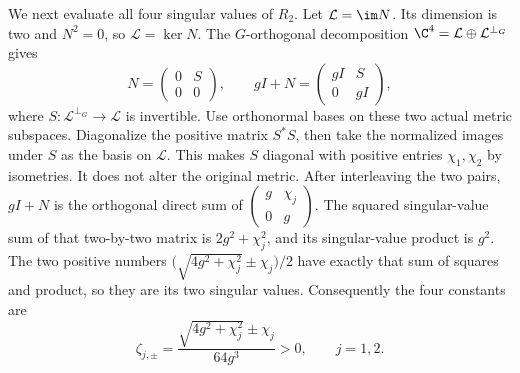 We next evaluate all four singular values of $R_2$.
Let $\mathcal L=\im N$. Its dimension is two and $N^2=0$,
so $\mathcal L=\ker N$. The $G$-orthogonal decomposition
$\C^4=\mathcal L\oplus\mathcal L^{\perp_G}$ gives
\begin{equation}
 N=\begin{pmatrix}0&S\\0&0\end{pmatrix},\qquad
 gI+N=\begin{pmatrix}gI&S\\0&gI\end{pmatrix},
 \tag{RS12}
\end{equation}
where $S:\mathcal L^{\perp_G}\to\mathcal L$ is invertible.
Use orthonormal bases on these two actual metric subspaces.
Diagonalize the positive matrix $S^*S$, then take the normalized
images under $S$ as the basis on $\mathcal L$. This makes $S$
diagonal with positive entries $\chi_1,\chi_2$ by isometries.
It does not alter the original metric. After interleaving the
two pairs, $gI+N$ is the orthogonal direct sum of
$\left(\begin{smallmatrix}g&\chi_j\\0&g\end{smallmatrix}\right)$.
The squared singular-value sum of that two-by-two matrix is
$2g^2+\chi_j^2$, and its singular-value product is $g^2$.
The two positive numbers
$\bigl(\sqrt{4g^2+\chi_j^2}\pm\chi_j\bigr)/2$
have exactly that sum of squares and product, so they are
its two singular values. Consequently the four constants are
\begin{equation}
 \zeta_{j,\pm}
 =\frac{\sqrt{4g^2+\chi_j^2}\pm\chi_j}{64g^3}>0,
 \qquad j=1,2.
 \tag{RS13}
\end{equation}

